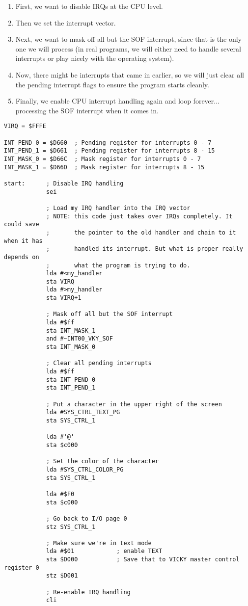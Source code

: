 \begin{enumerate}
    \item First, we want to disable IRQs at the CPU level.
    \item Then we set the interrupt vector.
    \item Next, we want to mask off all but the SOF interrupt, since that is the only one we will process (in real programs, we will either need to handle several interrupts or play nicely with the operating system).
    \item Now, there might be interrupts that came in earlier, so we will just clear all the pending interrupt flags to ensure the program starts cleanly.
    \item Finally, we enable CPU interrupt handling again and loop forever... processing the SOF interrupt when it comes in.
\end{enumerate}

\begin{verbatim}
VIRQ = $FFFE

INT_PEND_0 = $D660  ; Pending register for interrupts 0 - 7
INT_PEND_1 = $D661  ; Pending register for interrupts 8 - 15
INT_MASK_0 = $D66C  ; Mask register for interrupts 0 - 7
INT_MASK_1 = $D66D  ; Mask register for interrupts 8 - 15

start:      ; Disable IRQ handling
            sei

            ; Load my IRQ handler into the IRQ vector
            ; NOTE: this code just takes over IRQs completely. It could save
            ;       the pointer to the old handler and chain to it when it has
            ;       handled its interrupt. But what is proper really depends on
            ;       what the program is trying to do.
            lda #<my_handler
            sta VIRQ
            lda #>my_handler
            sta VIRQ+1

            ; Mask off all but the SOF interrupt
            lda #$ff
            sta INT_MASK_1
            and #~INT00_VKY_SOF
            sta INT_MASK_0

            ; Clear all pending interrupts
            lda #$ff
            sta INT_PEND_0
            sta INT_PEND_1

            ; Put a character in the upper right of the screen
            lda #SYS_CTRL_TEXT_PG
            sta SYS_CTRL_1

            lda #'@'
            sta $c000

            ; Set the color of the character
            lda #SYS_CTRL_COLOR_PG
            sta SYS_CTRL_1

            lda #$F0
            sta $c000

            ; Go back to I/O page 0
            stz SYS_CTRL_1

            ; Make sure we're in text mode
            lda #$01            ; enable TEXT
            sta $D000           ; Save that to VICKY master control register 0
            stz $D001

            ; Re-enable IRQ handling
            cli
\end{verbatim}


